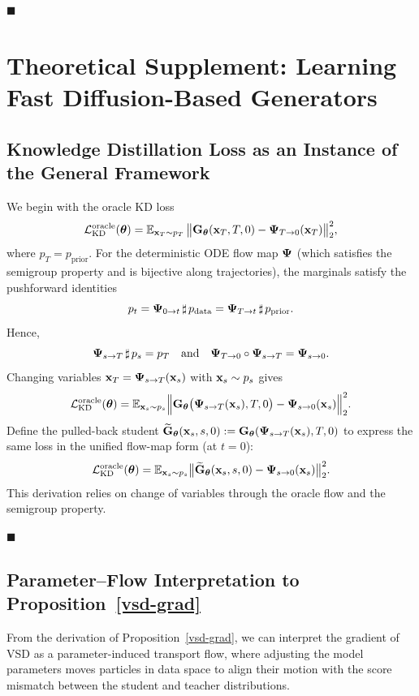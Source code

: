 \hfill$\blacksquare$



\clearpage
\newpage


\section{Theoretical Supplement: Learning Fast Diffusion-Based Generators}\label{app-sec:flow-map}

\subsection{Knowledge Distillation Loss as an Instance of the General Framework }

We begin with the oracle KD loss
\[
\mathcal{L}_{\mathrm{KD}}^{\text{oracle}}({\bm{\theta}})
=\mathbb{E}_{{\mathbf{x}}_T\sim p_T}\,
\big\|{\mathbf{G}}_{\bm{\theta}}({\mathbf{x}}_T,T,0)-{\bm{\Psi}}_{T\to 0}({\mathbf{x}}_T)\big\|_2^2,
\]
where $p_T = p_{\mathrm{prior}}$. For the deterministic ODE flow map ${\bm{\Psi}}$ (which satisfies the semigroup property and is bijective along trajectories), the marginals satisfy the pushforward identities
\[
p_t
= {\bm{\Psi}}_{0\to t}\,\sharp\,p_{\mathrm{data}}
= {\bm{\Psi}}_{T\to t}\,\sharp\,p_{\mathrm{prior}}.
\]
Hence,
\[
{\bm{\Psi}}_{s\to T}\,\sharp\,p_s=p_T
\quad\text{and}\quad
{\bm{\Psi}}_{T\to 0}\circ{\bm{\Psi}}_{s\to T}={\bm{\Psi}}_{s\to 0}.
\]
Changing variables ${\mathbf{x}}_T={\bm{\Psi}}_{s\to T}({\mathbf{x}}_s)$ with ${\mathbf{x}}_s\sim p_s$ gives
\[
\mathcal{L}_{\mathrm{KD}}^{\text{oracle}}({\bm{\theta}})
= \mathbb{E}_{{\mathbf{x}}_s\sim p_s} 
\Big\|{\mathbf{G}}_{\bm{\theta}} \big({\bm{\Psi}}_{s\to T}({\mathbf{x}}_s),T,0\big)
- {\bm{\Psi}}_{s\to 0}({\mathbf{x}}_s)\Big\|_2^2.
\]
Define the pulled-back student $\widetilde{{\mathbf{G}}}_{\bm{\theta}}({\mathbf{x}}_s,s,0):=
{\mathbf{G}}_{\bm{\theta}}({\bm{\Psi}}_{s\to T}({\mathbf{x}}_s),T,0)$ to express the same loss in the unified flow-map form (at $t=0$):
\begin{align*}
\mathcal{L}_{\mathrm{KD}}^{\text{oracle}}({\bm{\theta}})
= \mathbb{E}_{{\mathbf{x}}_s\sim p_s} 
\big\|\widetilde{{\mathbf{G}}}_{\bm{\theta}}({\mathbf{x}}_s,s,0)-{\bm{\Psi}}_{s\to 0}({\mathbf{x}}_s)\big\|_2^2.
\end{align*}
This derivation relies on change of variables through the oracle flow and the semigroup property.

\hfill$\blacksquare$

\subsection{Parameter–Flow Interpretation to Proposition~\ref{vsd-grad}}
From the derivation of Proposition~\ref{vsd-grad}, we can interpret the gradient of VSD as a parameter-induced transport flow, where adjusting the model parameters moves particles in data space to align their motion with the score mismatch between the student and teacher distributions.

